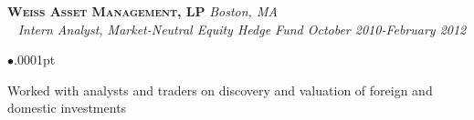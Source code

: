 \documentclass[11pt]{article}
\newcommand{\employer}[4]{
	{\hspace*{-20pt} {\small{\textbf{\textsc{ #1}}}}
  \hfill \small{\emph{#2}}\\ ~\hspace*{-20pt} \small \emph{ #3 \hfill #4}}\\ }
\newenvironment{achievements}{\begin{list}{$\bullet$}{\topsep .0001pt \itemsep -2pt}}{\vspace*{5pt}\end{list} }
\begin{document}


\employer{Weiss Asset Management, LP} {Boston, MA} {Intern Analyst, Market-Neutral Equity Hedge Fund} {October 2010-February 2012}
	\begin{achievements}
		\item Worked with analysts and traders on discovery and valuation of foreign and domestic investments %
	\end{achievements}

	
\end{document}
